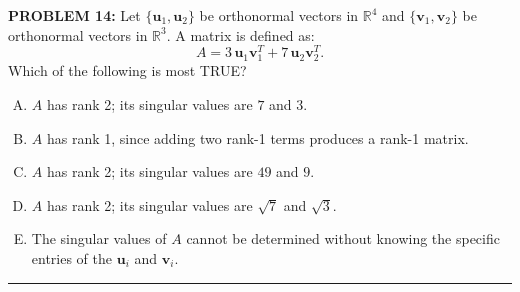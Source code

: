 \documentclass[12pt]{amsart}
\newcommand{\divider}{
  \vspace{-1em} %
  \noindent
  \raisebox{-0.15ex}{\textbullet}%
  \hspace{0.5em}%
  \rule[0.5ex]{0.95\textwidth}{1.0pt}%
  \hspace{0.5em}%
  \raisebox{-0.15ex}{\textbullet}%
  \vspace{0em} %
}
\begin{document}
{\bf PROBLEM 14:}
Let $\{\mathbf{u}_1, \mathbf{u}_2\}$ be orthonormal vectors in $\mathbb{R}^4$ and
$\{\mathbf{v}_1, \mathbf{v}_2\}$ be orthonormal vectors in $\mathbb{R}^3$. A matrix is defined as:
$$A = 3\,\mathbf{u}_1\mathbf{v}_1^T + 7\,\mathbf{u}_2\mathbf{v}_2^T.$$
Which of the following is most TRUE?
\begin{enumerate}[(A)]
\item $A$ has rank 2; its singular values are $7$ and $3$.
\item $A$ has rank 1, since adding two rank-1 terms produces a rank-1 matrix.
\item $A$ has rank 2; its singular values are $49$ and $9$.
\item $A$ has rank 2; its singular values are $\sqrt{7}$ and $\sqrt{3}$.
\item The singular values of $A$ cannot be determined without knowing the specific
  entries of the $\mathbf{u}_i$ and $\mathbf{v}_i$.
\end{enumerate}
%
%
%
\divider
\end{document}
